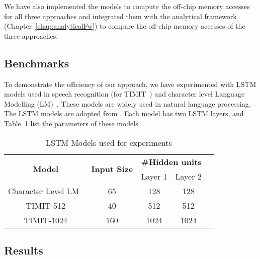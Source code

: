 {We have also implemented the models to compute the off-chip memory accesses for all three approaches and integrated them with the analytical framework (Chapter~\ref{chap:analyticalFw}) to compare the off-chip memory accesses of the three approaches.
\subsection{Benchmarks}
To demonstrate the efficiency of our approach, we have experimented with LSTM models used in speech recognition (for TIMIT~\cite{garofolo1993timit}) and character level Language Modelling (LM)~\cite{sundermeyer2015feedforward}. These models are widely used in natural language processing. The LSTM models are adopted from \cite{azari2020elsa,park2018maximizing,han2017ese}. Each model has two LSTM layers, and Table~\ref{tab:lstmModels} list the parameters of these models.
\begin{table}[htb]
	\centering
	\caption{LSTM Models used for experiments}
	\begin{tabular}{@{}ccccll@{}}
		\toprule
		\multirow{2}{*}{\textbf{Model}} & \multirow{2}{*}{\textbf{Input Size}} & \multicolumn{2}{c}{\textbf{\#Hidden units}} & \multicolumn{2}{l}{\multirow{5}{*}{}} \\ \cmidrule(lr){3-4}
		&                                      & Layer 1              & Layer 2              & \multicolumn{2}{l}{}                  \\ \cmidrule(r){1-4}
		Character Level LM~\cite{azari2020elsa}                              & 65                                   & 128                  & 128                  & \multicolumn{2}{l}{}                  \\ \cmidrule(r){1-4}
		TIMIT-512 \cite{park2018maximizing}                      & 40                                   & 512                  & 512                  & \multicolumn{2}{l}{}                  \\ \cmidrule(r){1-4}
		TIMIT-1024 \cite{han2017ese}                     & 160                                  & 1024                 & 1024                 & \multicolumn{2}{l}{}                  \\ \bottomrule
	\end{tabular}
	\label{tab:lstmModels}
\end{table}
\subsection{Results}
}
